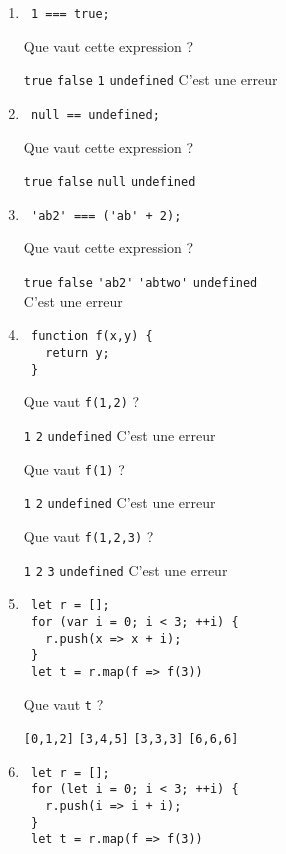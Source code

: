 \documentclass[a4paper, 12pt]{article}
\newcommand{\choice}[1]{\Square\hspace{2pt} #1\hspace{5pt}}
\newcommand{\choicec}[1]{\Square\hspace{2pt} \lstinline{#1}\hspace{5pt}}
\newcommand{\fullpoint}[1]{\textcolor{RubineRed}{#1}}
\newcommand{\choicecg}[1]{\fullpoint{\XBox\hspace{2pt} \lstinline{#1}\hspace{5pt}}}
\begin{document}
\begin{enumerate}
\item \lstset{language=javascript}
\begin{lstlisting}
 1 === true;
\end{lstlisting}

  Que vaut cette expression ?

  \choicec{true} \choicecg{false} \choicec{1} \choicec{undefined} \choice{C'est une erreur}
\item \lstset{language=javascript}
\begin{lstlisting}
 null == undefined;
\end{lstlisting}

  Que vaut cette expression ?

  \choicecg{true} \choicec{false} \choicec{null} \choicec{undefined}
\item \lstset{language=javascript}
\begin{lstlisting}
 'ab2' === ('ab' + 2);
\end{lstlisting}

  Que vaut cette expression ?

  \choicecg{true} \choicec{false} \choicec{'ab2'} \choicec{'abtwo'}
  \choicec{undefined}\\\choice{C'est une erreur}
\item \begin{lstlisting}
 function f(x,y) {
   return y;
 }
\end{lstlisting}

  Que vaut \lstinline{f(1,2)} ?

  \choicec{1} \choicecg{2} \choicec{undefined} \choice{C'est une erreur}

  Que vaut \lstinline{f(1)} ?

  \choicec{1} \choicec{2} \choicecg{undefined} \choice{C'est une erreur}

  Que vaut \lstinline{f(1,2,3)} ?

  \choicec{1} \choicecg{2} \choicec{3} \choicec{undefined} \choice{C'est une erreur}
\item \lstset{language=javascript}
\begin{lstlisting}
 let r = [];
 for (var i = 0; i < 3; ++i) {
   r.push(x => x + i);
 }
 let t = r.map(f => f(3))
\end{lstlisting}

  Que vaut \lstinline{t} ?

  \choicec{[0,1,2]} \choicec{[3,4,5]} \choicec{[3,3,3]} \choicecg{[6,6,6]}

\newpage
\item \lstset{language=javascript}
\begin{lstlisting}
 let r = [];
 for (let i = 0; i < 3; ++i) {
   r.push(i => i + i);
 }
 let t = r.map(f => f(3))
\end{lstlisting}


\end{enumerate}
\end{document}
